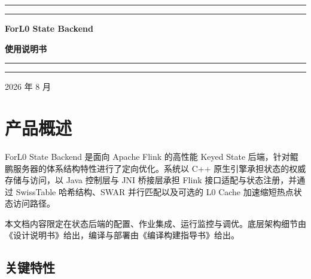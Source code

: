 \documentclass[a4paper,11pt]{article}
\newcommand{\project}{ForL0 State Backend}
\newcommand{\coverrule}{{\color{accent}\rule{\linewidth}{0.9pt}}}
\newcommand{\coverrulethin}{{\color{accent!55}\rule{\linewidth}{0.3pt}}}
\begin{document}
\begin{titlepage}
\thispagestyle{empty}
\centering
\vspace*{5.5cm}

\coverrule
\vspace{2pt}
\coverrulethin

\vspace{1.6cm}
{\sffamily\huge\bfseries\color{accent} \project\par}
\vspace{0.8cm}
{\sffamily\LARGE\bfseries 使用说明书\par}

\vspace{1.6cm}
\coverrulethin
\vspace{2pt}
\coverrule

\vfill

{\sffamily\large\color{accent!85} 2026 年 8 月\par}

\vspace{1.2cm}
\end{titlepage}

\pagestyle{plain}
\tableofcontents
\clearpage
{}
\setcounter{page}{1}
\pagestyle{fancy}

\section{产品概述}

\project{} 是面向 Apache Flink 的高性能 Keyed State 后端，针对鲲鹏服务器的体系结构特性进行了定向优化。系统以 C++ 原生引擎承担状态的权威存储与访问，以 Java 控制层与 JNI 桥接层承担 Flink 接口适配与状态注册，并通过 SwissTable 哈希结构、SWAR 并行匹配以及可选的 L0 Cache 加速缩短热点状态访问路径。

本文档内容限定在状态后端的配置、作业集成、运行监控与调优。底层架构细节由《设计说明书》给出，编译与部署由《编译构建指导书》给出。

\subsection{关键特性}
\end{document}
